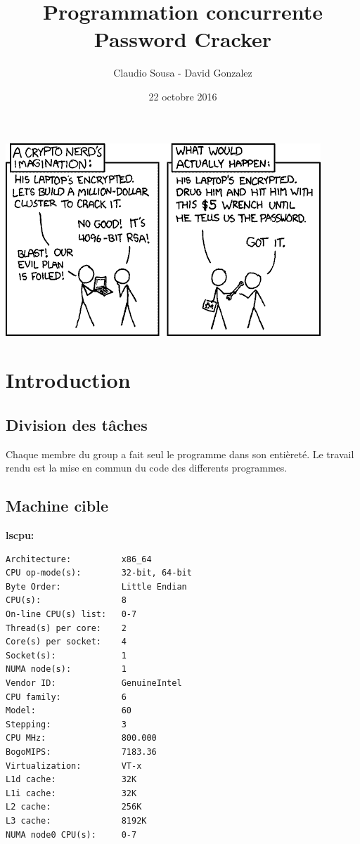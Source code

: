 \documentclass[11pt, a4paper]{article}
\begin{document}
\title
{
    \Huge{Programmation concurrente} \\
    \Huge{Password Cracker}
}
\author
{
	\LARGE{Claudio Sousa - David Gonzalez}
}
\date{22 octobre 2016}
\maketitle

\vspace{50pt}

\begin{center}
    \includegraphics[scale=.8]{frontpage.png}
\end{center}

\thispagestyle{empty}

\newpage

\section{Introduction}
\subsection{Division des tâches}
Chaque membre du group a fait seul le programme dans son entièreté. Le travail rendu est la mise en commun du code des differents programmes.

\subsection{Machine cible}
\textbf{lscpu:}
\begin{lstlisting}
Architecture:          x86_64
CPU op-mode(s):        32-bit, 64-bit
Byte Order:            Little Endian
CPU(s):                8
On-line CPU(s) list:   0-7
Thread(s) per core:    2
Core(s) per socket:    4
Socket(s):             1
NUMA node(s):          1
Vendor ID:             GenuineIntel
CPU family:            6
Model:                 60
Stepping:              3
CPU MHz:               800.000
BogoMIPS:              7183.36
Virtualization:        VT-x
L1d cache:             32K
L1i cache:             32K
L2 cache:              256K
L3 cache:              8192K
NUMA node0 CPU(s):     0-7
\end{lstlisting}
\end{document}
